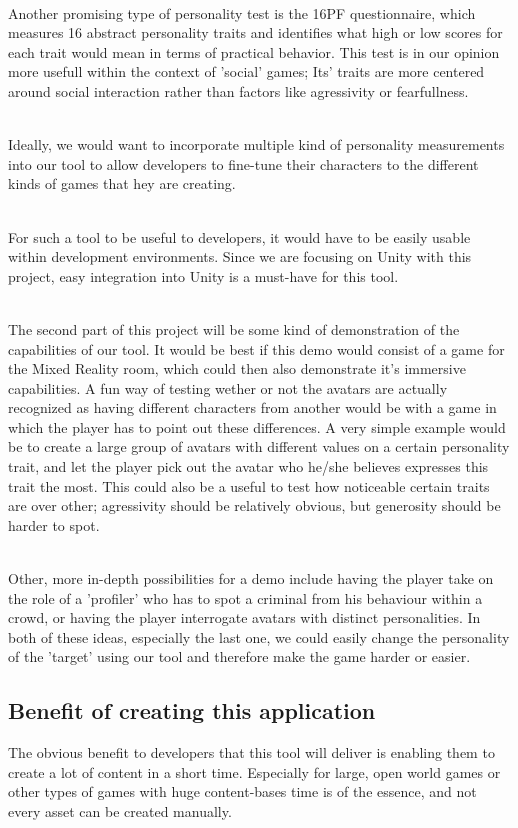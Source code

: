 \documentclass[11pt]{article}
\begin{document}
\newpage
{}
~\\
Another promising type of personality test is the 16PF questionnaire, which measures 16 abstract personality traits and identifies what high or low scores for each trait would mean in terms of practical behavior. This test is in our opinion more usefull within the context of 'social' games; Its' traits are more centered around social interaction rather than factors like agressivity or fearfullness.

~\\
Ideally, we would want to incorporate multiple kind of personality measurements into our tool to allow developers to fine-tune their characters to the different kinds of games that hey are creating.

~\\
For such a tool to be useful to developers, it would have to be easily usable within development environments. Since we are focusing on Unity with this project, easy integration into Unity is a must-have for this tool.

~\\
The second part of this project will be some kind of demonstration of the capabilities of our tool. It would be best if this demo would consist of a game for the Mixed Reality room, which could then also demonstrate it's immersive capabilities. A fun way of testing wether or not the avatars are actually recognized as having different characters from another would be with a game in which the player has to point out these differences. A very simple example would be to create a large group of avatars with different values on a certain personality trait, and let the player pick out the avatar who he/she believes expresses this trait the most. This could also be a useful to test how noticeable certain traits are over other; agressivity should be relatively obvious, but generosity should be harder to spot.

~\\
Other, more in-depth possibilities for a demo include having the player take on the role of a 'profiler' who has to spot a criminal from his behaviour within a crowd, or having the player interrogate avatars with distinct personalities. In both of these ideas, especially the last one, we could easily change the personality of the 'target' using our tool and therefore make the game harder or easier.


\newpage
{}
{}
\subsection*{Benefit of creating this application}
The obvious benefit to developers that this tool will deliver is enabling them to create a lot of content in a short time. Especially for large, open world games or other types of games with huge content-bases time is of the essence, and not every asset can be created manually.
\end{document}
